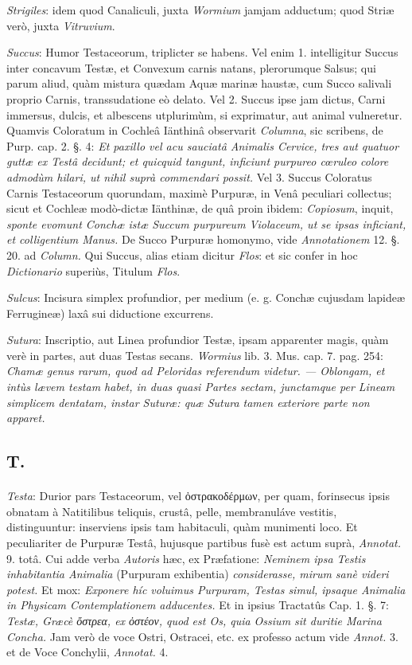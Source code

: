 \documentclass[a4paper, 11pt, oneside, polutonikogreek, german]{article}
\begin{document}
\emph{Strigiles}: idem quod Canaliculi, juxta \emph{Wormium} jamjam adductum; quod Striæ verò, juxta \emph{Vitruvium}.

\emph{Succus}: Humor Testaceorum, triplicter se habens. Vel enim 1. intelligitur Succus inter concavum Testæ, et Convexum carnis natans, plerorumque Salsus; qui parum aliud, quàm mistura quædam Aquæ marinæ haustæ, cum Succo salivali proprio Carnis, transsudatione eò delato. Vel 2. Succus ipse jam dictus, Carni immersus, dulcis, et albescens utplurimùm, si exprimatur, aut animal vulneretur. Quamvis Coloratum in Cochleâ Iänthinâ observarit \emph{Columna}, sic scribens, de Purp. cap. 2. §. 4: \emph{Et paxillo vel acu sauciatâ Animalis Cervice, tres aut quatuor guttæ ex Testâ decidunt; et quicquid tangunt, inficiunt purpureo cœruleo colore admodùm hilari, ut nihil suprà commendari possit.} Vel 3. Succus Coloratus Carnis Testaceorum quorundam, maximè Purpuræ, in Venâ peculiari collectus; sicut et Cochleæ modò-dictæ Iänthinæ, de quâ proin ibidem: \emph{Copiosum}, inquit, \emph{sponte evomunt Conchæ istæ Succum purpureum Violaceum, ut se ipsas inficiant, et colligentium Manus.} De Succo Purpuræ homonymo, vide \emph{Annotationem} 12. §. 20. ad \emph{Column.} Qui Succus, alias etiam dicitur \emph{Flos}: et sic confer in hoc \emph{Dictionario} superiùs, Titulum \emph{Flos}.

\emph{Sulcus}: Incisura simplex profundior, per medium (e. g. Conchæ cujusdam lapideæ Ferrugineæ) laxâ sui diductione excurrens.

\emph{Sutura}: Inscriptio, aut Linea profundior Testæ, ipsam apparenter magis, quàm verè in partes, aut duas Testas secans. \emph{Wormius} lib. 3. Mus. cap. 7. pag. 254: \emph{Chamæ genus rarum, quod ad Peloridas referendum videtur. --- Oblongam, et intùs lævem testam habet, in duas quasi Partes sectam, junctamque per Lineam simplicem dentatam, instar Suturæ: quæ Sutura tamen exteriore parte non apparet.}

\subsection{T.}
\paragraph{}
\emph{Testa}: Durior pars Testaceorum, vel ὀστρακοδέρμων, per quam, forinsecus ipsis obnatam à Natitilibus teliquis, crustâ, pelle, membranuláve vestitis, distinguuntur: inserviens ipsis tam habitaculi, quàm munimenti loco. Et peculiariter de Purpuræ Testâ, hujusque partibus fusè est actum suprà, \emph{Annotat.} 9. totâ. Cui adde verba \emph{Autoris} hæc, ex Præfatione: \emph{Neminem ipsa Testis inhabitantia Animalia} (Purpuram exhibentia) \emph{considerasse, mirum sanè videri potest.} Et mox: \emph{Exponere híc voluimus Purpuram, Testas simul, ipsaque Animalia in Physicam Contemplationem adducentes.} Et in ipsius Tractatûs Cap. 1. §. 7: \emph{Testæ, Græcè ὄστρεα, ex ὀστέον, quod est Os, quia Ossium sit duritie Marina Concha.} Jam verò de voce Ostri, Ostracei, etc. ex professo actum vide \emph{Annot.} 3. et de Voce Conchylii, \emph{Annotat.} 4.
\end{document}
